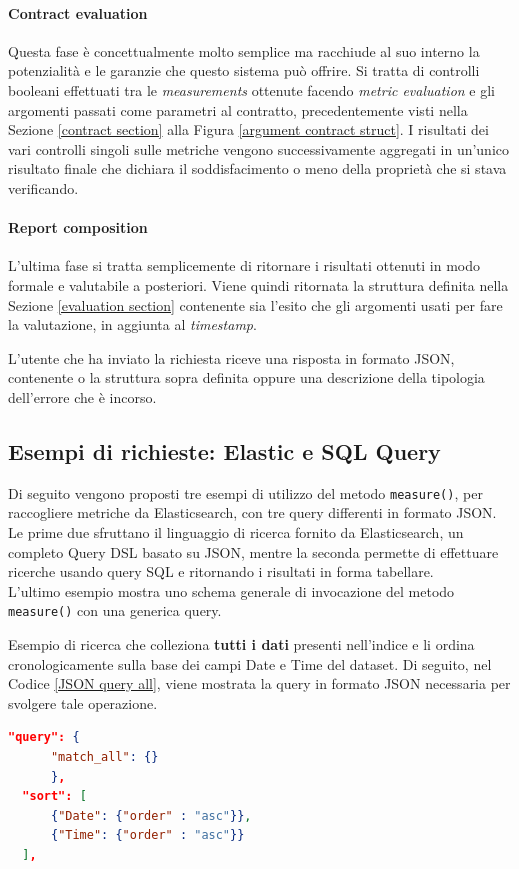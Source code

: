 \paragraph{Contract evaluation}
Questa fase è concettualmente molto semplice ma racchiude al suo interno la potenzialità e le garanzie che questo sistema può offrire. Si tratta di controlli booleani effettuati tra le \emph{measurements} ottenute facendo \emph{metric evaluation} e gli argomenti passati come parametri al contratto, precedentemente visti nella Sezione \ref{contract section} alla Figura \ref{argument contract struct}.
I risultati dei vari controlli singoli sulle metriche vengono successivamente aggregati in un'unico risultato finale che dichiara il soddisfacimento o meno della proprietà che si stava verificando.

\paragraph{Report composition}
L'ultima fase si tratta semplicemente di ritornare i risultati ottenuti in modo formale e valutabile a posteriori. Viene quindi ritornata la struttura definita nella Sezione \ref{evaluation section} contenente sia l'esito che gli argomenti usati per fare la valutazione, in aggiunta al \textit{timestamp}.

L'utente che ha inviato la richiesta riceve una risposta in formato JSON, contenente o la struttura sopra definita oppure una descrizione della tipologia dell'errore che è incorso.


\subsection{Esempi di richieste: Elastic e SQL Query}
Di seguito vengono proposti tre esempi di utilizzo del metodo \texttt{measure()}, per raccogliere metriche da Elasticsearch, con tre query differenti in formato JSON. Le prime due sfruttano il linguaggio di ricerca fornito da Elasticsearch, un completo Query \gls{DSL} basato su JSON, mentre la seconda permette di effettuare ricerche usando query SQL e ritornando i risultati in forma tabellare. \\
L'ultimo esempio mostra uno schema generale di invocazione del metodo \texttt{measure()} con una generica query.

\begin{exmp}
	Esempio di ricerca che colleziona \textbf{tutti i dati} presenti nell'indice e li ordina cronologicamente sulla base dei campi Date e Time del dataset. Di seguito, nel Codice \ref{JSON query all}, viene mostrata la query in formato JSON necessaria per svolgere tale operazione.

	\begin{lstlisting}[language=json, caption=Valori JSON per query \emph{match all} \label{JSON query all}, basicstyle=\ttfamily]
  "query": {
      "match_all": {}
      },
  "sort": [
      {"Date": {"order" : "asc"}},
      {"Time": {"order" : "asc"}}
  ],
  \end{lstlisting}
\end{exmp}

